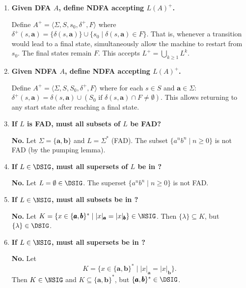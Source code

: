 \begin{enumerate}[{5.}1. ]
The missing ingredient in the textbook proof is exactly the inductive claim
\[
\overline{\delta^\cup}(s,x)=
\begin{cases}
\DBAR_1(s,x), & s\in S_1,\\
\DBAR_2(s,x), & s\in S_2,
\end{cases}
\]
which is proved later in Exercise~5.50.

\item \textbf{Given DFA $A$, define NDFA accepting $L(A)^+$.}

Define $A^+=\langle\Sigma,S,s_0,\delta^+,F\rangle$ where
$\delta^+(s,\pmb{a})=\{\delta(s,\pmb{a})\}\cup\{s_0\mid\delta(s,\pmb{a})\in F\}$.
That is, whenever a transition would lead to a final state, simultaneously allow the machine to restart from $s_0$.  The final states remain $F$.  This accepts $L^+=\bigcup_{k\ge 1}L^k$.

\item \textbf{Given NDFA $A$, define NDFA accepting $L(A)^+$.}

Define
$A^+=\langle\Sigma,S,S_0,\delta^+,F\rangle$ where for each $s\in S$ and $\pmb{a}\in\Sigma$:
$\delta^+(s,\pmb{a})=\delta(s,\pmb{a})\cup(S_0\text{ if }\delta(s,\pmb{a})\cap F\neq\emptyset)$.
This allows returning to any start state after reaching a final state.

\item \textbf{If $L$ is FAD, must all subsets of $L$ be FAD?}

\textbf{No.}  Let $\Sigma=\{\pmb{a},\pmb{b}\}$ and $L=\Sigma^*$ (FAD).  The subset
$\{a^nb^n\mid n\ge 0\}$ is not FAD (by the pumping lemma).

\item \textbf{If $L\in\DSIG$, must all supersets of $L$ be in \DSIG?}

\textbf{No.}  Let $L=\emptyset\in\DSIG$.  The superset $\{a^nb^n\mid n\ge 0\}$ is not FAD.

\item \textbf{If $L\in\NSIG$, must all subsets be in \NSIG?}

\textbf{No.}  Let
$K=\{x\in\{\pmb{a},\pmb{b}\}^*\mid |x|_{\pmb{a}}=|x|_{\pmb{b}}\}\in\NSIG$.
Then $\{\lambda\}\subseteq K$, but $\{\lambda\}\in\DSIG$.

\item \textbf{If $L\in\NSIG$, must all supersets be in \NSIG?}

\textbf{No.}  Let
\[
K=\{x\in\{\pmb{a},\pmb{b}\}^*\mid |x|_{\pmb{a}}=|x|_{\pmb{b}}\}.
\]
Then $K\in\NSIG$ and
$K\subseteq\{\pmb{a},\pmb{b}\}^*$, but $\{\pmb{a},\pmb{b}\}^*\in\DSIG$.


\end{enumerate}
